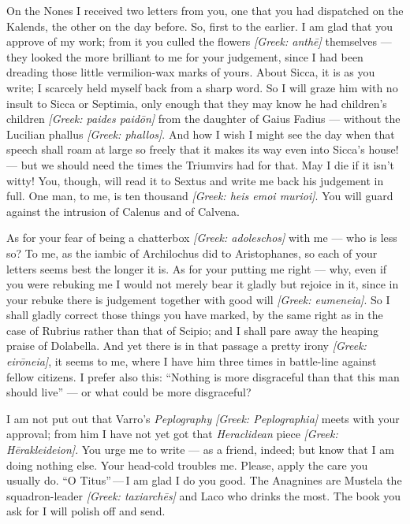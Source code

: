 

 On the Nones I received two letters from you, one that you had dispatched on the Kalends, the other on the day before. So, first to the earlier. I am glad that you approve of my work; from it you culled the flowers \textit{[Greek: anthē]} themselves --- they looked the more brilliant to me for your judgement, since I had been dreading those little vermilion-wax marks of yours. About Sicca, it is as you write; I scarcely held myself back from a sharp word. So I will graze him with no insult to Sicca or Septimia, only enough that they may know he had children's children \textit{[Greek: paides paidōn]} from the daughter of Gaius Fadius --- without the Lucilian phallus \textit{[Greek: phallos]}. And how I wish I might see the day when that speech shall roam at large so freely that it makes its way even into Sicca's house! --- but we should need the times the Triumvirs had for that. May I die if it isn't witty! You, though, will read it to Sextus and write me back his judgement in full. One man, to me, is ten thousand \textit{[Greek: heis emoi murioi]}. You will guard against the intrusion of Calenus and of Calvena.

 As for your fear of being a chatterbox \textit{[Greek: adoleschos]} with me --- who is less so? To me, as the iambic of Archilochus did to Aristophanes, so each of your letters seems best the longer it is. As for your putting me right --- why, even if you were rebuking me I would not merely bear it gladly but rejoice in it, since in your rebuke there is judgement together with good will \textit{[Greek: eumeneia]}. So I shall gladly correct those things you have marked, by the same right as in the case of Rubrius rather than that of Scipio; and I shall pare away the heaping praise of Dolabella. And yet there is in that passage a pretty irony \textit{[Greek: eirōneia]}, it seems to me, where I have him three times in battle-line against fellow citizens. I prefer also this: ``Nothing is more disgraceful than that this man should live'' --- or what could be more disgraceful?

 I am not put out that Varro's \textit{Peplography} \textit{[Greek: Peplographia]} meets with your approval; from him I have not yet got that \textit{Heraclidean} piece \textit{[Greek: Hērakleideion]}. You urge me to write --- as a friend, indeed; but know that I am doing nothing else. Your head-cold troubles me. Please, apply the care you usually do. ``O Titus''\,---\,I am glad I do you good. The Anagnines are Mustela the squadron-leader \textit{[Greek: taxiarchēs]} and Laco who drinks the most. The book you ask for I will polish off and send.

